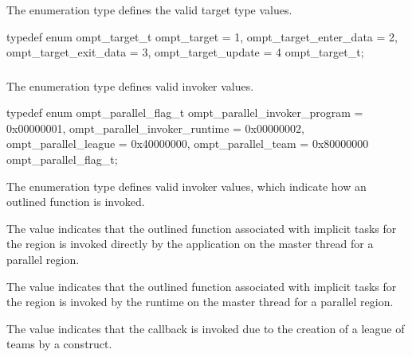 \subsubsection{}
\label{sec:ompt_target_t}

\summary
The  enumeration type defines the valid target type values.

\format
\begin{ccppspecific}
\begin{omptEnum}
typedef enum ompt_target_t {
  ompt_target                         = 1,
  ompt_target_enter_data              = 2,
  ompt_target_exit_data               = 3,
  ompt_target_update                  = 4
} ompt_target_t;
\end{omptEnum}
\end{ccppspecific}



\subsubsection{}
\label{sec:ompt_parallel_flag_t}

\summary
The  enumeration type defines valid invoker values.

\format
\begin{ccppspecific}
\begin{omptEnum}
typedef enum ompt_parallel_flag_t {
  ompt_parallel_invoker_program = 0x00000001,
  ompt_parallel_invoker_runtime = 0x00000002,
  ompt_parallel_league          = 0x40000000,
  ompt_parallel_team            = 0x80000000
} ompt_parallel_flag_t;
\end{omptEnum}
\end{ccppspecific}

\descr
The  enumeration type defines valid invoker values,
which indicate how an outlined function is invoked. 

The value  indicates that the outlined 
function associated with implicit tasks for the region is invoked directly 
by the application on the master thread for a parallel region.

The value  indicates that the outlined 
function associated with implicit tasks for the region is invoked by the 
runtime on the master thread for a parallel region.

The value  indicates that the callback is invoked
due to the creation of a league of teams by a  construct.

